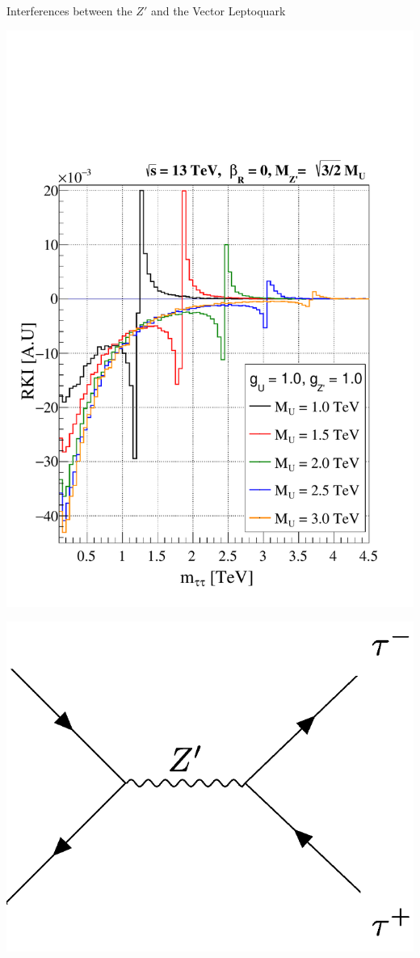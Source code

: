 \documentclass{../bredelebeamer}
\begin{document}
\begin{frame}{Interferences between the $Z'$ and the Vector Leptoquark}

	\begin{minipage}{.50\linewidth}
		\includegraphics[width=\linewidth]{Kinematic_Interference_gu_1.0_gzp_1.0_zp_upper_limit_woRHC.pdf}
	\end{minipage}
	\begin{minipage}{.48\linewidth}
		\begin{center}
			\includegraphics[width=\linewidth]{Zp.png}
		\end{center}


\end{minipage}
\end{frame}
\end{document}
